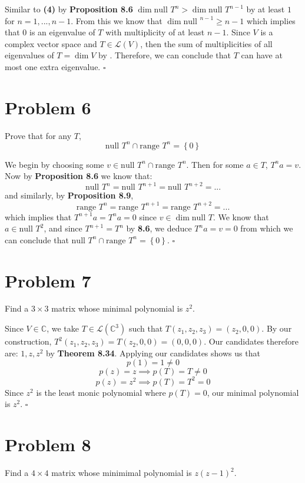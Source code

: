 \documentclass[12pt]{article}
\newcommand{\C}{\mathbb{C}}
\newcommand{\set}[1]{\left\{ #1\right\}}
\newenvironment{proof}{\noindent{\bf Proof.}}{\hfill $\square$\medskip}
\begin{document}
\begin{proof}
Similar to \textbf{(4)} by \textbf{Proposition 8.6} $\dim\text{null }T^{n}>\dim\text{null }T^{n-1}$ by at least $1$ for $n=1,...,n-1$. From this we know that $\dim\text{null }^{n-1}\geq n-1$ which implies that $0$ is an eigenvalue of $T$ with multiplicity of at least $n-1$. Since $V$ is a complex vector space and $T\in\mathcal{L}(V)$, then the sum of multiplicities of all eigenvalues of $T=\dim V$ by . Therefore, we can conclude that $T$ can have at most one extra eigenvalue.
\end{proof}


\newpage
\section{Problem 6}
Prove that for any $T$,
$$\text{null }T^{n}\cap\text{range }T^{n}=\set{0}$$

\begin{proof}
We begin by choosing some $v\in\text{null }T^{n}\cap\text{range }T^{n}$. Then for some $a\in T$, $T^{n}a=v$. Now by \textbf{Proposition 8.6} we know that:
$$\text{null }T^{n}=\text{null }T^{n+1}=\text{null }T^{n+2}=...$$ 
and similarly, by \textbf{Proposition 8.9},
$$\text{range }T^{n}=\text{range }T^{n+1}=\text{range }T^{n+2}=...$$ 
which implies that $T^{n+1}a=T^{n}a=0$ since $v\in\dim\text{null }T$. We know that $a\in\text{null }T^{2}$, and since $T^{n+1}=T^{n}$ by \textbf{8.6}, we deduce $T^{n}a=v=0$ from which we can conclude that $\text{null }T^{n}\cap\text{range }T^{n}=\set{0}$.
\end{proof}


\section{Problem 7}
Find a $3\times3$ matrix whose minimal polynomial is $z^{2}$.

\begin{proof}
Since $V\in\C$, we take $T\in\mathcal{L}(\C^{3})$ such that $T(z_{1},z_{2},z_{3})=(z_{2},0,0)$. By our construction, $T^{2}(z_{1},z_{2},z_{3})=T(z_{2},0,0)=(0,0,0)$. Our candidates therefore are: $1,z,z^{2}$ by \textbf{Theorem 8.34}. Applying our candidates shows us that 
$$p(1)=1\neq0$$ 
$$p(z)=z\implies p(T)=T\neq0$$
$$p(z)=z^{2}\implies p(T)=T^{2}=0$$
Since $z^{2}$ is the least monic polynomial where $p(T)=0$, our minimal polynomial is $z^{2}$. 
\end{proof}


\newpage
\section{Problem 8}
Find a $4\times4$ matrix whose minimimal polynomial is $z(z-1)^{2}$.
\end{document}
